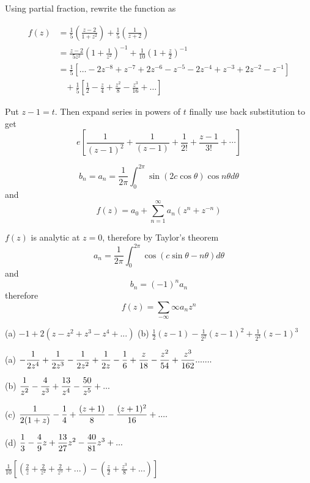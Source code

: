 \begin{Solution}{3.2}
Using partial fraction, rewrite the function as

\begin{align*}
f(z) & =\frac{1}{5}\left(\frac{z-2}{1+z^{2}}\right)+\frac{1}{5}\left(\frac{1}{z+2}\right)\\
 & =\frac{z-2}{5z^{2}}\left(1+\frac{1}{z^{2}}\right)^{-1}+\frac{1}{10}\left(1+\frac{z}{2}\right)^{-1}\\
 & =\frac{1}{5}\left[\ldots-2z^{-8}+z^{-7}+2z^{-6}-z^{-5}-2z^{-4}+z^{-3}+2z^{-2}-z^{-1}\right]\\
 & \;\;\;+\frac{1}{5}\left[\frac{1}{2}-\frac{z}{4}+\frac{z^{2}}{8}-\frac{z^{3}}{16}+\ldots\right]\end{align*}
\end{Solution}
\begin{Solution}{3.3}
Put $z-1=t$. Then expand series in powers of $t$ finally use back substitution to get
\[e\left[\frac{1}{(z-1)^2}+\frac{1}{(z-1)}+\frac{1}{2!}+\frac{z-1}{3!} + \cdots \right]\]
\end{Solution}
\begin{Solution}{3.4}
\[b_n = a_n = \frac{1}{2\pi}\int_0^{2\pi}\sin(2c \cos \theta)\cos n\theta d\theta\]
and
\[f(z) = a_0 + \sum_{n=1}^{\infty}a_{n}(z^{n}+z^{-n})\]
\end{Solution}
\begin{Solution}{3.5}
$f(z)$ is analytic at $z=0$, therefore by Taylor's theorem
\[a_n =\frac{1}{2\pi}\int_0^{2\pi}\cos(c\sin \theta -n\theta) d\theta \]
and
\[b_n = (-1)^n a_n\]
therefore
\[f(z) = \sum_{-\infty}{\infty} a_nz^n\]
\end{Solution}
\begin{Solution}{3.6}
(a) $-1+2(z-z^{2}+z^{3}-z^{4}+...)$
\noindent
(b) $\frac{1}{2}(z-1)-\frac{1}{2^{2}}(z-1)^{2}+\frac{1}{2^{3}}(z-1)^{3}$
\end{Solution}
\begin{Solution}{3.7}
(a) $\displaystyle -\frac{1}{2z^{4}}+\frac{1}{2z^{3}}-\frac{1}{2z^{2}}+\frac{1}{2z}-\frac{1}{6}+\frac{z}{18}-\frac{z^{2}}{54}+\frac{z^{3}}{162}.......$

(b) $\displaystyle \frac{1}{z^{2}}-\frac{4}{z^{3}}+\frac{13}{z^{4}}-\frac{50}{z^{5}}+...$

(c) $\displaystyle \frac{1}{2(1+z)}-\frac{1}{4}+\frac{(z+1)}{8}-\frac{(z+1)^{2}}{16}+....$

(d) $\displaystyle \frac{1}{3}-\frac{4}{9}z+\frac{13}{27}z^{2}-\frac{40}{81}z^{3}+...$
\end{Solution}
\begin{Solution}{3.9}
$\frac{1}{10}[(\frac{2}{z}+\frac{2}{z^{2}}+\frac{2}{z^{5}}+...)-(\frac{z}{2}+\frac{z^{3}}{8}+...)]$
\end{Solution}
